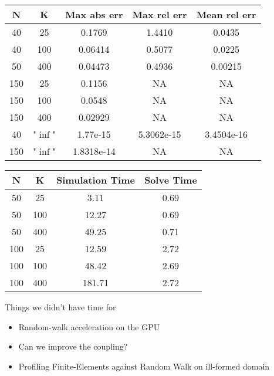\documentclass{beamer}
\begin{document}
\begin{frame}
\begin{center}
	\begin{tabular}{|c|c|c|c|c|}
		\hline
		N & K & Max abs err & Max rel err & Mean rel err \\  
		\hline 
		40 & 25 & 0.1769 & 1.4410 & 0.0435 \\
		40 & 100 & 0.06414 & 0.5077 & 0.0225 \\
		50 & 400 & 0.04473 & 0.4936 & 0.00215 \\
		150 & 25 & 0.1156 & NA & NA \\
		150 & 100 & 0.0548 & NA & NA \\
		150 & 400 & 0.02929 & NA & NA \\
		40 & "$\inf$" & 1.77e-15 & 5.3062e-15 & 3.4504e-16 \\ 
		150 & "$\inf$" & 1.8318e-14 & NA & NA \\
		\hline
	\end{tabular}
	\end{center}
\end{frame}


\begin{frame}
	\begin{centering}
		\begin{tabular}{|c|c|c|c|}
			\hline
			N&K&Simulation Time&Solve Time\\
			\hline
			50&25&3.11&0.69\\
			50&100&12.27&0.69\\
			50&400&49.25&0.71\\
			100&25&12.59&2.72\\
			100&100&48.42&2.69\\
			100&400&181.71&2.72\\
			\hline
			\end{tabular}
	\end{centering}
	
\end{frame}

\begin{frame}{Things we didn't have time for}
	\begin{itemize}
		\item Random-walk acceleration on the GPU
		\item Can we improve the coupling?
		\item Profiling Finite-Elements against Random Walk on ill-formed domain
	\end{itemize}
\end{frame}

\end{document}
